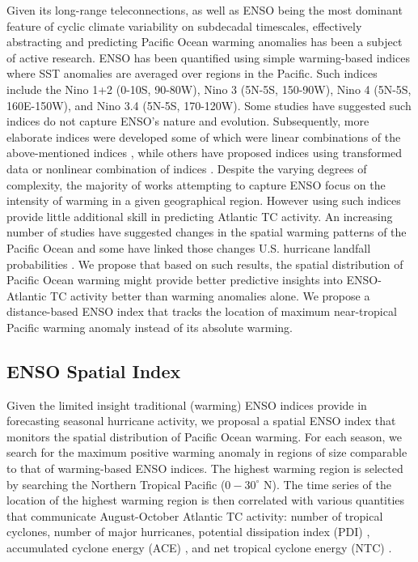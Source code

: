 \documentclass[]{article}
\begin{document}
Given its long-range teleconnections, as well as ENSO being the most dominant feature of cyclic climate variability on subdecadal timescales, effectively abstracting and predicting Pacific Ocean warming anomalies has been a subject of active research. ENSO has been quantified using simple warming-based indices where SST anomalies are averaged over regions in the Pacific. Such indices include the Nino 1+2 (0-10S, 90-80W), Nino 3 (5N-5S, 150-90W), Nino 4 (5N-5S, 160E-150W), and Nino 3.4 (5N-5S, 170-120W). Some studies have suggested such indices do not capture ENSO's nature and evolution. Subsequently, more elaborate indices were developed some of which were linear combinations of the above-mentioned indices \cite{trenberth2001}, while others have proposed indices using transformed data or nonlinear combination of indices \cite{ren2011}. Despite the varying degrees of complexity, the majority of works attempting to capture ENSO focus on the intensity of warming in a given geographical region. However using such indices provide little additional skill in predicting Atlantic TC activity.
An increasing number of studies have suggested changes in the spatial warming patterns of the Pacific Ocean and some have linked those changes U.S. hurricane landfall probabilities \cite{kim2009}. We propose that based on such results, the spatial distribution of Pacific Ocean warming might provide better predictive insights into ENSO-Atlantic TC activity better than warming anomalies alone. We propose a distance-based ENSO index that tracks the location of maximum near-tropical Pacific warming anomaly instead of its absolute warming. 


\subsection{ENSO Spatial Index}
Given the limited insight traditional (warming) ENSO indices provide in forecasting seasonal hurricane activity, we proposal a spatial ENSO index that monitors the spatial distribution of Pacific Ocean warming. For each season, we search for the maximum positive warming anomaly in regions of size comparable to that of warming-based ENSO indices. The highest warming region is selected by searching the Northern Tropical Pacific ($0-30^\circ$ N). The time series of the location of the highest warming region is then correlated with various quantities that communicate August-October Atlantic TC activity: number of tropical cyclones, number of major hurricanes, potential dissipation index (PDI) \cite{emanuel2005a}, accumulated cyclone energy (ACE) \cite{Bell2000}, and net tropical cyclone energy (NTC) \cite{goldenberg2001}.
\end{document}
